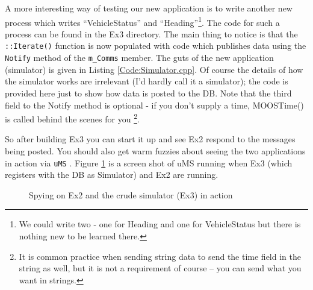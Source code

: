 \documentclass[a4paper,10pt]{article}
\newcommand{\Code}[1]{\texttt{#1} }
\newcommand{\code}[1]{\Code{#1} }
\begin{document}
A more interesting way of testing our new application is to write another new process which writes ``VehicleStatus'' and ``Heading''\footnote{We could write two - one for Heading and one for VehicleStatus but there is nothing new to be learned there.}. The code for such a process can be found in the Ex3 directory. The main thing to notice is that the \code{::Iterate()} function is now populated with code which publishes data using the \code{Notify} method of the \code{m\_Comms} member. The guts of the new application (simulator) is given in Listing \ref{Code:Simulator.cpp}. Of course the details of how the simulator works are irrelevant (I'd hardly call it a simulator); the code is provided here just to show how data is posted to the DB. Note that the third field to the Notify method is optional - if you don't supply a time, MOOSTime() is called behind the scenes for you \footnote{It is common practice when sending string data to send the time field in the string as well, but it is not a requirement of course -- you can send what you want in strings.}.



So after building Ex3  you can start it up and see Ex2 respond to the messages being posted. You should also get warm fuzzies about seeing the two applications in action via \code{uMS}. Figure \ref{Fig:UsingSim} is a screen shot of uMS running when Ex3 (which registers with the DB as Simulator) and Ex2 are running.

\begin{figure}\label{Fig:UsingSim}
\centering
{}
\caption{Spying on Ex2 and the crude simulator (Ex3) in action}
\end{figure}
\end{document}
